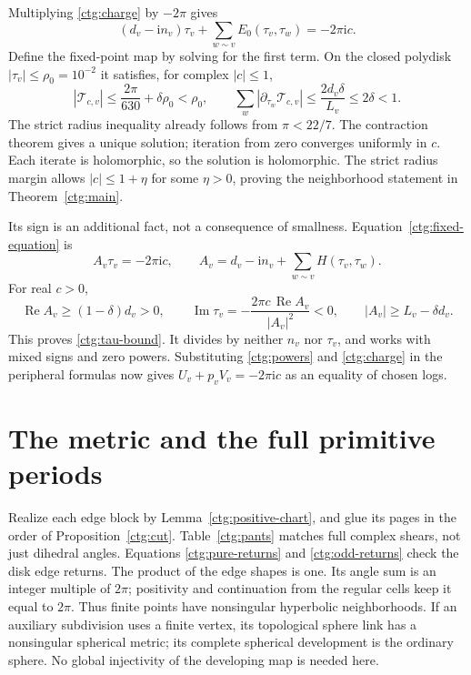 \documentclass[11pt]{article}
\numberwithin{equation}{section}
\theoremstyle{definition}
\theoremstyle{remark}
\newcommand{\ii}{\mathrm i}
\newcommand{\Rea}{\operatorname{Re}}
\newcommand{\Ima}{\operatorname{Im}}
\begin{document}
Multiplying \eqref{ctg:charge} by $-2\pi$ gives
\begin{equation}\label{ctg:fixed-equation}
 (d_v-\ii n_v)\tau_v+
       \sum_{w\sim v}E_0(\tau_v,\tau_w)=-2\pi\ii c.
\end{equation}
Define the fixed-point map by solving for the first term. On the
closed polydisk $|\tau_v|\le\rho_0=10^{-2}$ it satisfies, for
complex $|c|\le1$,
\begin{equation}\label{ctg:contraction-bounds}
 |\mathcal T_{c,v}|\le\frac{2\pi}{630}+\delta\rho_0<\rho_0,
 \qquad
 \sum_w|\partial_{\tau_w}\mathcal T_{c,v}|
        \le\frac{2d_v\delta}{L_v}\le2\delta<1.
\end{equation}
The strict radius inequality already follows from $\pi<22/7$.
The contraction theorem gives a unique solution; iteration from zero
converges uniformly in $c$. Each iterate is holomorphic, so the
solution is holomorphic. The strict radius margin allows
$|c|\le1+\eta$ for some $\eta>0$, proving the neighborhood statement
in Theorem~\ref{ctg:main}.

Its sign is an additional fact, not a consequence of smallness.
Equation~\eqref{ctg:fixed-equation} is
\begin{equation}\label{ctg:denominator}
 A_v\tau_v=-2\pi\ii c,\qquad
 A_v=d_v-\ii n_v+\sum_{w\sim v}H(\tau_v,\tau_w).
\end{equation}
For real $c>0$,
\begin{equation}\label{ctg:sign}
 \Rea A_v\ge(1-\delta)d_v>0,\qquad
 \Ima\tau_v=-\frac{2\pi c\,\Rea A_v}{|A_v|^2}<0,
 \qquad |A_v|\ge L_v-\delta d_v.
\end{equation}
This proves \eqref{ctg:tau-bound}. It divides by neither $n_v$ nor
$\tau_v$, and works with mixed signs and zero powers. Substituting
\eqref{ctg:powers} and \eqref{ctg:charge} in the peripheral formulas
now gives $U_v+p_vV_v=-2\pi\ii c$ as an equality of chosen logs.

\section{The metric and the full primitive periods}
\label{ctg:metric}

Realize each edge block by Lemma~\ref{ctg:positive-chart}, and glue its
pages in the order of Proposition~\ref{ctg:cut}. Table~\eqref{ctg:pants}
matches full complex shears, not just dihedral angles. Equations
\eqref{ctg:pure-returns} and \eqref{ctg:odd-returns} check the disk
edge returns. The product of the edge shapes is one. Its angle sum is an integer
multiple of $2\pi$; positivity and continuation from the regular
cells keep it equal to $2\pi$. Thus finite points have
nonsingular hyperbolic neighborhoods. If an auxiliary subdivision
uses a finite vertex, its topological sphere link has a nonsingular
spherical metric; its complete spherical development is the ordinary
sphere. No global injectivity of the developing map is needed here.
\end{document}
